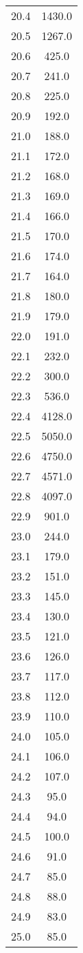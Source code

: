 \begin{table}
\begin{minipage}{0.5\textwidth}
\begin{tabular}{c c}
20.4	&	1430.0\\
20.5	&	1267.0\\
20.6	&	425.0\\
20.7	&	241.0\\
20.8	&	225.0\\
20.9	&	192.0\\
21.0	&	188.0\\
21.1	&	172.0\\
21.2	&	168.0\\
21.3	&	169.0\\
21.4	&	166.0\\
21.5	&	170.0\\
21.6	&	174.0\\
21.7	&	164.0\\
21.8	&	180.0\\
21.9	&	179.0\\
22.0	&	191.0\\
22.1	&	232.0\\
22.2	&	300.0\\
22.3	&	536.0\\
22.4	&	4128.0\\
22.5	&	5050.0\\
22.6	&	4750.0\\
22.7	&	4571.0\\
22.8	&	4097.0\\
22.9	&	901.0\\
23.0	&	244.0\\
23.1	&	179.0\\
23.2	&	151.0\\
23.3	&	145.0\\
23.4	&	130.0\\
23.5	&	121.0\\
23.6	&	126.0\\
23.7	&	117.0\\
23.8	&	112.0\\
23.9	&	110.0\\
24.0	&	105.0\\
24.1	&	106.0\\
24.2	&	107.0\\
24.3	&	95.0\\
24.4	&	94.0\\
24.5	&	100.0\\
24.6	&	91.0\\
24.7	&	85.0\\
24.8	&	88.0\\
24.9	&	83.0\\
25.0	&	85.0\\
    \bottomrule
\end{tabular}
\end{minipage}
\end{table}